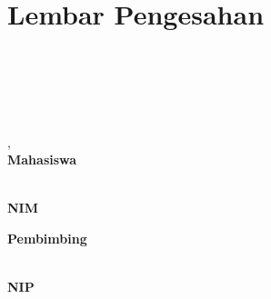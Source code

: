 \chapter*{Lembar Pengesahan}

{
    
    \begin{center}
        
        \MakeUppercase{\judul}
        
        \vspace{.5cm}
        
        \dotsfill{\linewidth}{0ex} \\[.3cm]
        \dotsfill{\linewidth}{0ex} \\[.3cm]
        \dotsfill{\linewidth}{0ex} \\[.3cm]
        \dotsfill{\linewidth}{0ex} \\[.3cm]
        \dotsfill{\linewidth}{0ex}
        
        \vfill
        
        \daerahKampus, \tanggalLengkap \\
        \textbf{Mahasiswa}
        
        \vspace{2.1cm} %
        
        \textbf{\namaMahasiswa} \\
        \textbf{NIM \nimMahasiswa}
        
        \vspace{1cm}
        
        \textbf{Pembimbing}
        
        \vspace{2.1cm} %
        
        \textbf{\namaPembimbing} \\
        \textbf{NIP \nipPembimbing}
        
        \vfill
    \end{center}
}